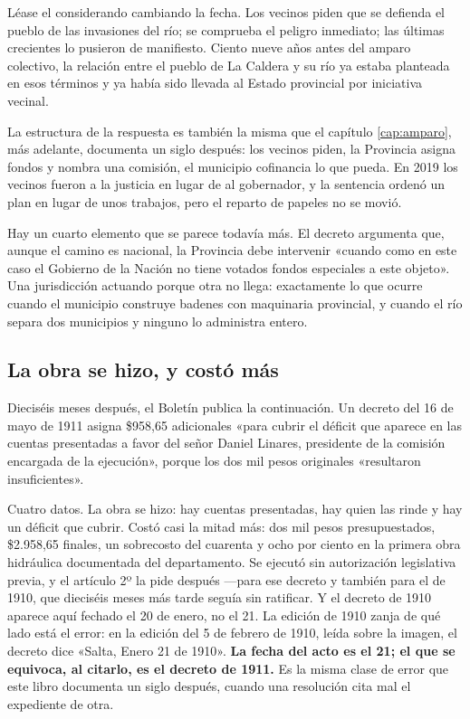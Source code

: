 Léase el considerando cambiando la fecha. Los vecinos piden que se defienda el pueblo de
las invasiones del río; se comprueba el peligro inmediato; las últimas crecientes lo
pusieron de manifiesto. Ciento nueve años antes del amparo colectivo, la relación entre el
pueblo de La Caldera y su río ya estaba planteada en esos términos y ya había sido llevada
al Estado provincial por iniciativa vecinal.

La estructura de la respuesta es también la misma que el capítulo \ref{cap:amparo}, más adelante, documenta un siglo
después: los vecinos piden, la Provincia asigna fondos y nombra una comisión, el municipio
cofinancia lo que pueda. En 2019 los vecinos fueron a la justicia en lugar de al
gobernador, y la sentencia ordenó un plan en lugar de unos trabajos, pero el reparto de
papeles no se movió.

Hay un cuarto elemento que se parece todavía más. El decreto argumenta que, aunque el
camino es nacional, la Provincia debe intervenir «cuando como en este caso el Gobierno de
la Nación no tiene votados fondos especiales a este objeto». Una jurisdicción actuando
porque otra no llega: exactamente lo que ocurre cuando el municipio construye badenes con
maquinaria provincial, y cuando el río separa dos municipios y ninguno lo administra
entero.

\subsection*{La obra se hizo, y costó más}

Dieciséis meses después, el Boletín publica la continuación. Un decreto del 16 de mayo de
1911 asigna \$958,65 adicionales «para cubrir el déficit que aparece en las cuentas
presentadas a favor del señor Daniel Linares, presidente de la comisión encargada de la
ejecución», porque los dos mil pesos originales «resultaron insuficientes».

Cuatro datos. La obra se hizo: hay cuentas
presentadas, hay quien las rinde y hay un déficit que cubrir. Costó casi la mitad más: dos
mil pesos presupuestados, \$2.958,65 finales, un sobrecosto del cuarenta y ocho por ciento
en la primera obra hidráulica documentada del departamento. Se ejecutó sin autorización
legislativa previa, y el artículo 2º la pide después —para ese decreto y también para el de
1910, que dieciséis meses más tarde seguía sin ratificar. Y el decreto de 1910 aparece aquí
fechado el 20 de enero, no el 21. La edición de 1910 zanja de qué lado está el error: en la
edición del 5 de febrero de 1910, leída sobre la imagen, el decreto dice «Salta, Enero 21 de
1910». \textbf{La fecha del acto es el 21; el que se equivoca, al citarlo, es el decreto de
1911.} Es la misma clase de error que este libro documenta un siglo después, cuando una
resolución cita mal el expediente de otra.

